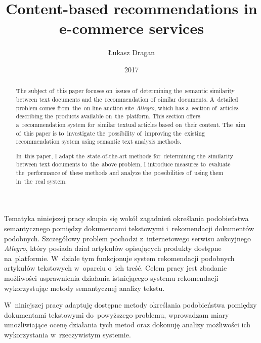 \documentclass[pl]{minipw} %
\title{Content-based recommendations in e-commerce services} %
\author{Łukasz Dragan}
\date{2017}
\begin{document}
\sloppy






\setcounter{page}{1}


\begin{streszczenie}

	Tematyka niniejszej pracy skupia się wokół zagadnień określania podobieństwa semantycznego pomiędzy dokumentami tekstowymi i~rekomendacji dokumentów podobnych. Szczegółowy problem pochodzi z~internetowego serwisu aukcyjnego \textit{Allegro}, który posiada dział artykułów opisujących produkty dostępne na~platformie. W~dziale tym funkcjonuje system rekomendacji podobnych artykułów tekstowych w~oparciu o~ich treść. Celem pracy jest zbadanie możliwości usprawnienia działania istniejącego systemu rekomendacji wykorzystując metody semantycznej analizy tekstu.
	
	W~niniejszej pracy adaptuję dostępne metody określania podobieństwa pomiędzy dokumentami tekstowymi do~powyższego problemu, wprowadzam miary umożliwiające ocenę działania tych metod oraz dokonuję analizy możliwości ich wykorzystania w~rzeczywistym systemie.
	
\end{streszczenie}


\begin{abstract}

	The subject of~this paper focuses on~issues of~determining the~semantic similarity between text documents and the~recommendation of~similar documents. A~detailed problem comes from~the~on-line auction site \textit{Allegro}, which has a~section of~articles describing the~products available on~the~platform. This section offers a~recommendation system for~similar textual articles based on~their content. The~aim of~this paper is to~investigate the~possibility of~improving the~existing recommendation system using semantic text analysis methods.
	
	In~this paper, I adapt the~state-of-the-art methods for~determining the~similarity between text documents to~the~above problem, I introduce measures to~evaluate the~performance of~these methods and analyze the~possibilities of~using them in~the~real system.
	
\end{abstract}
\end{document}
